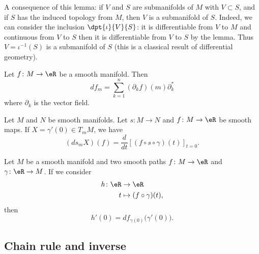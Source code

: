A consequence of this lemma: if $V$ and $S$ are submanifolds of $M$ with $V\subset S$, and if $S$ has the induced topology from $M$, then $V$ is a submanifold of $S$. Indeed, we can consider the inclusion $\dpt{\iota}{V}{S}$: it is differentiable from $V$ to $M$ and continuous from $V$ to $S$ then it is differentiable from $V$ to $S$ by the lemma. Thus $V=\iota^{-1}(S)$ is a submanifold of $S$ (this is a classical result of differential geometry).

\begin{proposition}	\label{PROPooNAACooIUMcNw}
	Let \(f \colon M\to \eR  \) be a smooth manifold. Then
	\begin{equation}
		df_m=\sum_{k=1}^n(\partial_kf)(m)\partial^*_k
	\end{equation}
	where \( \partial_k\) is the vector field.
\end{proposition}

\begin{proposition}	\label{PROPooCGWUooHehCXm}
	Let \( M\) and \( N\) be smooth manifolds. Let \(s \colon M\to N  \) and \(f \colon M\to \eR  \) be smooth maps. If \( X=\gamma'(0)\in T_mM\), we have
	\begin{equation}
		(ds_mX)(f)=\frac{d}{dt} \left[ (f\circ s\circ \gamma)(t)  \right]_{t=0}.
	\end{equation}
\end{proposition}


\begin{proposition}	\label{PROPooYRBRooLFVoqf}
	Let \( M\) be a smooth manifold and two smooth paths \(f \colon M\to \eR  \) and \(\gamma \colon \eR\to M  \). If we consider
	\begin{equation}
		\begin{aligned}
			h\colon \eR & \to \eR                    \\
			t           & \mapsto (f\circ\gamma)(t),
		\end{aligned}
	\end{equation}
	then
	\begin{equation}
		h'(0)=df_{\gamma(0)}\big( \gamma'(0) \big).
	\end{equation}
\end{proposition}


\subsection{Chain rule and inverse}

